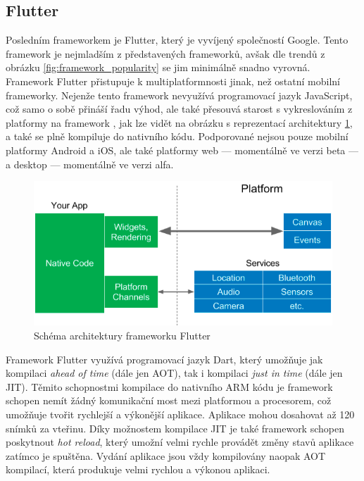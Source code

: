 \subsection{Flutter}

Posledním frameworkem je Flutter,
který je vyvíjený společností Google.
Tento framework je nejmladším z představených frameworků,
avšak dle trendů z obrázku \ref{fig:framework_popularity} se jim minimálně
snadno vyrovná.  
Framework Flutter přistupuje k multiplatformnosti jinak,
než ostatní mobilní frameworky.
Nejenže tento framework nevyužívá programovací jazyk JavaScript,
což samo o sobě přináší řadu výhod,
ale také přesouvá starost s vykreslováním z platformy na framework
\cite{hackernoon_flutter},
jak lze vidět na obrázku s reprezentací architektury
\ref{fig:framework_flutter},
a také se plně kompiluje do nativního kódu.
\cite{dashmagazine_mobile_frameworks}
Podporované nejsou pouze mobilní platformy Android a iOS,
ale také platformy web
--- momentálně ve verzi beta ---
a desktop
--- momentálně ve verzi alfa.

\begin{figure}[ht!]
    \centering
    \includegraphics[width=\linewidth]{assets/technology-research/framework/flutter.png}
    \caption{Schéma architektury frameworku Flutter  \cite{hackernoon_flutter}}
    \label{fig:framework_flutter}
\end{figure}

Framework Flutter využívá programovací jazyk Dart,
který umožňuje jak kompilaci \emph{ahead of time} (dále jen AOT),
tak i kompilaci \emph{just in time} (dále jen JIT).
\cite{hackernoon_flutter}
Těmito schopnostmi kompilace do nativního ARM kódu je framework schopen
nemít žádný komunikační most mezi platformou a procesorem,
což umožňuje tvořit rychlejší a výkonější aplikace.
Aplikace mohou dosahovat až 120 snímků za vteřinu.
\cite{dashmagazine_mobile_frameworks}
Díky možnostem kompilace JIT je také framework schopen poskytnout
\emph{hot reload},
který umožní velmi rychle provádět změny stavů aplikace zatímco je spuštěna.
Vydání aplikace jsou vždy kompilovány naopak AOT kompilací,
která produkuje velmi rychlou a výkonou aplikaci.
\cite{hackernoon_flutter}

